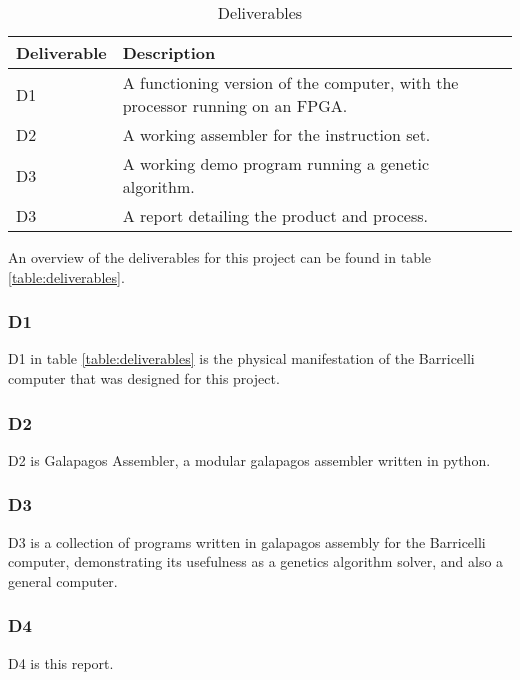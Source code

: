  \begin{table}[h]
 \begin{center}
 \begin{tabular}{| l | l |}
 \hline
 Deliverable & Description \\
 \hline
 D1 & A functioning version of the computer, with the processor running on an FPGA.\\
 D2 & A working assembler for the instruction set.\\
 D3 & A working demo program running a genetic algorithm.\\
 D3 & A report detailing the product and process.\\
 \hline
 \end{tabular}
 \caption{Deliverables}
 \label{table:deliverables}
 \end{center}
 \end{table}

An overview of the deliverables for this project can be found in table \vref{table:deliverables}.

\subsubsection{D1}

D1 in table \vref{table:deliverables} is the physical manifestation of the Barricelli computer that was designed for this project.

\subsubsection{D2}

D2 is Galapagos Assembler, a modular \gls{galapagos} assembler written in python.

\subsubsection{D3}

D3 is a collection of programs written in galapagos assembly for the Barricelli computer, demonstrating its usefulness as a genetics algorithm solver, and also a general computer.

\subsubsection{D4}

D4 is this report.

